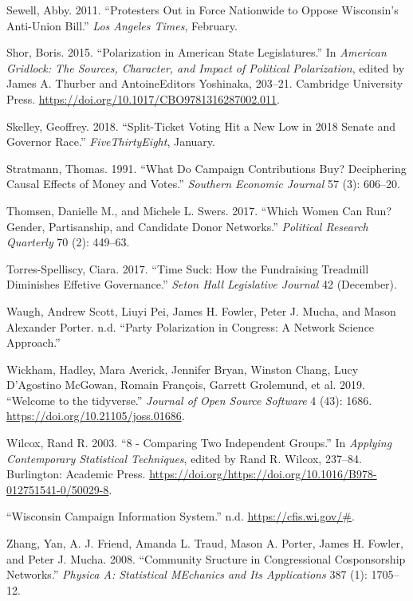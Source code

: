 \documentclass[12pt,]{article}
\begin{document}
\leavevmode\hypertarget{ref-sewell2011}{}%
Sewell, Abby. 2011. ``Protesters Out in Force Nationwide to Oppose
Wisconsin's Anti-Union Bill.'' \emph{Los Angeles Times}, February.

\leavevmode\hypertarget{ref-shor2015}{}%
Shor, Boris. 2015. ``Polarization in American State Legislatures.'' In
\emph{American Gridlock: The Sources, Character, and Impact of Political
Polarization}, edited by James A. Thurber and AntoineEditors Yoshinaka,
203--21. Cambridge University Press.
\url{https://doi.org/10.1017/CBO9781316287002.011}.

\leavevmode\hypertarget{ref-skelley2018}{}%
Skelley, Geoffrey. 2018. ``Split-Ticket Voting Hit a New Low in 2018
Senate and Governor Race.'' \emph{FiveThirtyEight}, January.

\leavevmode\hypertarget{ref-stratmann1991}{}%
Stratmann, Thomas. 1991. ``What Do Campaign Contributions Buy?
Deciphering Causal Effects of Money and Votes.'' \emph{Southern Economic
Journal} 57 (3): 606--20.

\leavevmode\hypertarget{ref-thomsen2017}{}%
Thomsen, Danielle M., and Michele L. Swers. 2017. ``Which Women Can Run?
Gender, Partisanship, and Candidate Donor Networks.'' \emph{Political
Research Quarterly} 70 (2): 449--63.

\leavevmode\hypertarget{ref-torres-spelliscy2017}{}%
Torres-Spelliscy, Ciara. 2017. ``Time Suck: How the Fundraising
Treadmill Diminishes Effetive Governance.'' \emph{Seton Hall Legislative
Journal} 42 (December).

\leavevmode\hypertarget{ref-waugh2009}{}%
Waugh, Andrew Scott, Liuyi Pei, James H. Fowler, Peter J. Mucha, and
Mason Alexander Porter. n.d. ``Party Polarization in Congress: A Network
Science Approach.''

\leavevmode\hypertarget{ref-tidyverse}{}%
Wickham, Hadley, Mara Averick, Jennifer Bryan, Winston Chang, Lucy
D'Agostino McGowan, Romain François, Garrett Grolemund, et al. 2019.
``Welcome to the tidyverse.'' \emph{Journal of Open Source Software} 4
(43): 1686. \url{https://doi.org/10.21105/joss.01686}.

\leavevmode\hypertarget{ref-wilcox2003}{}%
Wilcox, Rand R. 2003. ``8 - Comparing Two Independent Groups.'' In
\emph{Applying Contemporary Statistical Techniques}, edited by Rand R.
Wilcox, 237--84. Burlington: Academic Press.
\url{https://doi.org/https://doi.org/10.1016/B978-012751541-0/50029-8}.

\leavevmode\hypertarget{ref-cfis}{}%
``Wisconsin Campaign Information System.'' n.d.
\url{https://cfis.wi.gov/\#}.

\leavevmode\hypertarget{ref-zhang2008}{}%
Zhang, Yan, A. J. Friend, Amanda L. Traud, Mason A. Porter, James H.
Fowler, and Peter J. Mucha. 2008. ``Community Sructure in Congressional
Cosponsorship Networks.'' \emph{Physica A: Statistical MEchanics and Its
Applications} 387 (1): 1705--12.





\newpage
\singlespacing 
\end{document}
